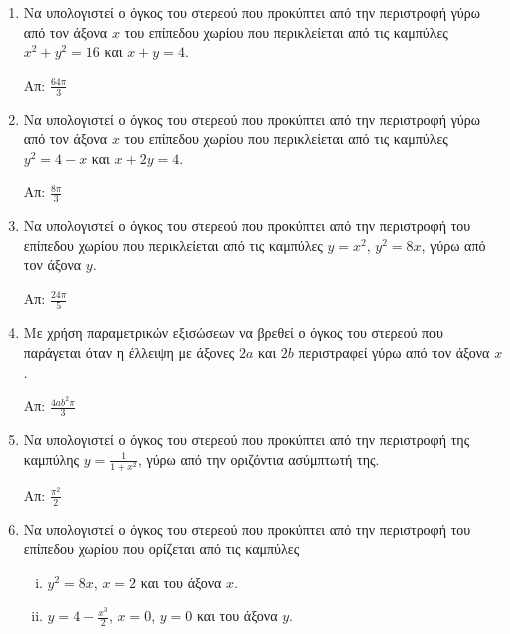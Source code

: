 


\everymath{\displaystyle}
\thispagestyle{empty}



\begin{center}
\end{center}

\vspace{\baselineskip}



\begin{enumerate}

\item Να υπολογιστεί ο όγκος του στερεού που προκύπτει από την περιστροφή γύρω
	από τον άξονα $x$ του επίπεδου χωρίου που περικλείεται από τις καμπύλες 
$ x^{2} + y^{2} = 16 $ και $ x+y=4 $.

\hfill Απ: $ \frac{64 \pi}{3} $

\item Να υπολογιστεί ο όγκος του στερεού που προκύπτει από την περιστροφή γύρω
	από τον άξονα $x$ του επίπεδου χωρίου που περικλείεται από τις καμπύλες 
$ y^{2} = 4-x $ και $ x+2y=4 $.

\hfill Απ: $ \frac{8 \pi}{3} $

\item Να υπολογιστεί ο όγκος του στερεού που προκύπτει από την περιστροφή του
	επίπεδου χωρίου που περικλείεται από τις καμπύλες $ y=x^{2} $, $ y^{2}=8x $,
	γύρω από τον άξονα $y$.

	\hfill Απ: $ \frac{24 \pi}{5} $

\item Με χρήση παραμετρικών εξισώσεων να βρεθεί ο όγκος του στερεού που παράγεται όταν η
	έλλειψη με άξονες $2a$ και $2b$ περιστραφεί γύρω από τον άξονα $x$.

	\hfill Απ: $ \frac{4ab^{2} \pi}{3} $
	
\item Να υπολογιστεί ο όγκος του στερεού που προκύπτει από την περιστροφή της καμπύλης 
    $ y = \frac{1}{1 + x^{2}} $, γύρω από την οριζόντια ασύμπτωτή της.

    \hfill Απ: $ \frac{\pi ^{2}}{2} $ 


\item Να υπολογιστεί ο όγκος του στερεού που προκύπτει από την περιστροφή του
	επίπεδου χωρίου που ορίζεται από τις καμπύλες 
	\begin{enumerate}[i)]
	\item 	$ y^{2} = 8x $, $ x=2 $ και	του άξονα $x$.
	\item $ y = 4 - \frac{x^{3}}{2} $, $ x=0 $, $ y=0 $ και του άξονα $y$.
	\end{enumerate}


\end{enumerate}
